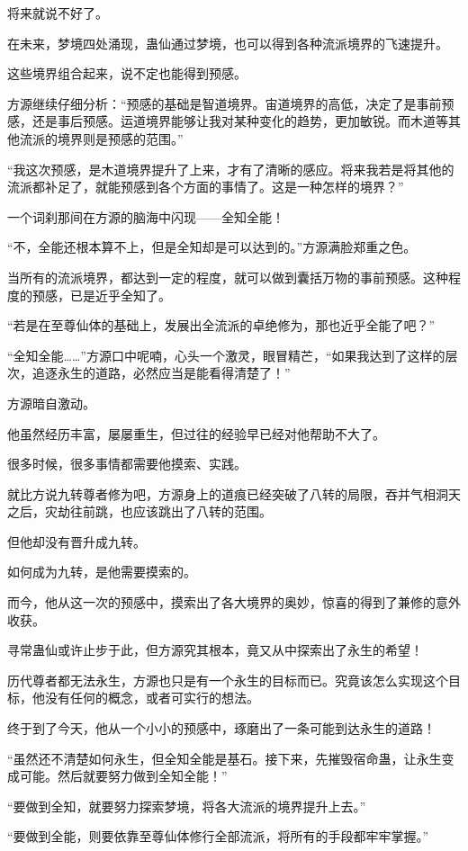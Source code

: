 \begin{this_body}
将来就说不好了。

在未来，梦境四处涌现，蛊仙通过梦境，也可以得到各种流派境界的飞速提升。

这些境界组合起来，说不定也能得到预感。

方源继续仔细分析：“预感的基础是智道境界。宙道境界的高低，决定了是事前预感，还是事后预感。运道境界能够让我对某种变化的趋势，更加敏锐。而木道等其他流派的境界则是预感的范围。”

“我这次预感，是木道境界提升了上来，才有了清晰的感应。将来我若是将其他的流派都补足了，就能预感到各个方面的事情了。这是一种怎样的境界？”

一个词刹那间在方源的脑海中闪现——全知全能！

“不，全能还根本算不上，但是全知却是可以达到的。”方源满脸郑重之色。

当所有的流派境界，都达到一定的程度，就可以做到囊括万物的事前预感。这种程度的预感，已是近乎全知了。

“若是在至尊仙体的基础上，发展出全流派的卓绝修为，那也近乎全能了吧？”

“全知全能……”方源口中呢喃，心头一个激灵，眼冒精芒，“如果我达到了这样的层次，追逐永生的道路，必然应当是能看得清楚了！”

方源暗自激动。

他虽然经历丰富，屡屡重生，但过往的经验早已经对他帮助不大了。

很多时候，很多事情都需要他摸索、实践。

就比方说九转尊者修为吧，方源身上的道痕已经突破了八转的局限，吞并气相洞天之后，灾劫往前跳，也应该跳出了八转的范围。

但他却没有晋升成九转。

如何成为九转，是他需要摸索的。

而今，他从这一次的预感中，摸索出了各大境界的奥妙，惊喜的得到了兼修的意外收获。

寻常蛊仙或许止步于此，但方源究其根本，竟又从中探索出了永生的希望！

历代尊者都无法永生，方源也只是有一个永生的目标而已。究竟该怎么实现这个目标，他没有任何的概念，或者可实行的想法。

终于到了今天，他从一个小小的预感中，琢磨出了一条可能到达永生的道路！

“虽然还不清楚如何永生，但全知全能是基石。接下来，先摧毁宿命蛊，让永生变成可能。然后就要努力做到全知全能！”

“要做到全知，就要努力探索梦境，将各大流派的境界提升上去。”

“要做到全能，则要依靠至尊仙体修行全部流派，将所有的手段都牢牢掌握。”


\end{this_body}
